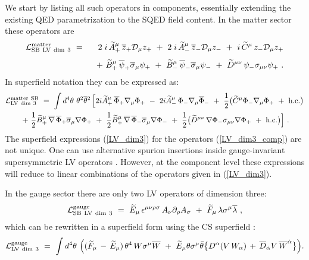 \documentclass[12pt]{revtex4}
\begin{document}
We start by listing all such operators in components, essentially
extending the existing QED parametrization \cite{Kost1}  to the SQED
field content. In the matter sector these 
operators are  
%
\begin{eqnarray}
{\cal L}_{\rm SB~LV~dim~3}^{\rm matter} 
&~=~& 
2\;i\, \widetilde{A}_+^\mu\, \overline{z}_+ \mathcal{D}_\mu z_+ 
~+~ 2\;i\, \widetilde{A}_-^\mu\, \overline{z}_-\mathcal{D}_\mu z_- 
~+~i\, \widetilde{C}^\mu\, z_- \mathcal{D}_\mu z_+ 
\label{LV_dim3_comp}
\\[1ex] 
\nonumber
&& 
~+~\widetilde{B}_+^\mu\, \overline{\psi}_+\overline{\sigma}_\mu \psi_+ 
~+~ \widetilde{B}_-^\mu\, \overline{\psi}_-\overline{\sigma}_\mu \psi_-
 ~+~\widetilde{D}^{\mu\nu}\, \psi_- \sigma_{\mu\nu} \psi_+~.
\end{eqnarray}
%
In superfield notation they can be expressed as:
\begin{gather}
{\cal L}_{\rm LV~dim~3}^{\rm matter~SB} ~=~  
\int d^4\theta~ \theta^2\overline{\theta}{}^2 \, \Big[
2i  \widetilde{A}_+^\mu\,\overline{\Phi}_+ \nabla_\mu \Phi_+
~-~ 2i \widetilde{A}_-^\mu\, \Phi_-  \nabla_\mu \overline{\Phi}_-  
~+~ \frac 12\big(\widetilde{C}^\mu  \Phi_- \nabla_\mu \Phi_+ 
~+~ \text{h.c.}\big) 
\nonumber\\
\label{LV_dim3}
~+~ \frac{1}{2} \widetilde{B}_+^\mu\, 
\overline{\nabla}\, \overline{\Phi}_+ \overline{\sigma}_\mu \nabla \Phi_+
~+~ \frac{1}{2}\widetilde{B}_+^\mu\, 
\overline{\nabla}\, \overline{\Phi}_- \overline{\sigma}_\mu \nabla \Phi_- 
~+~ \frac 12\big(
\widetilde{D}^{\mu\nu}\, \nabla \Phi_- \sigma_{\mu\nu} \nabla \Phi_+
~+~ \text{h.c.}\big)
\Big]~. 
\end{gather}
%
The superfield expressions (\ref{LV_dim3}) for the operators
(\ref{LV_dim3_comp}) are not unique.  One can use alternative spurion
insertions  inside gauge-invariant supersymmetric LV operators
\cite{GrootNibbelink:2004za}. However, at the component level these
expressions will reduce to linear combinations of the operators given
in (\ref{LV_dim3}).


In the gauge sector there are only two LV operators of dimension 
three: 
\begin{eqnarray}
{\cal L}_{\rm SB~LV~dim~3}^{\rm gauge} ~=~ 
\widetilde{E}_\mu\, \epsilon^{\mu\nu\rho\sigma}\, 
A_\nu \partial_\rho A_\sigma  ~+~ 
\widetilde{F}_\mu\, \lambda \sigma^\mu \overline{\lambda} 
~,
\end{eqnarray}
%
which can be rewritten in a superfield form using the 
CS superfield \cite{Cecotti:1987nw}:
\begin{eqnarray}
\label{CSint}
{\cal L}_{\rm LV ~dim~3}^{\rm gauge} ~=~ \int d^4\theta~ 
\Big(
(\widetilde{F}_\mu \,-\,   \widetilde{E}_\mu)\, \theta^4\, 
 W \sigma^\mu \overline{W} 
~+~ \widetilde{E}_\mu\theta \sigma^\mu\bar\theta 
\big\{ 
D^\alpha (V\, W_\alpha) 
\,+\,  
\overline{D}_{\dot\alpha}V\, \overline{W}^{\dot\alpha}
\big\}
\Big).
\end{eqnarray}
%
\end{document}

